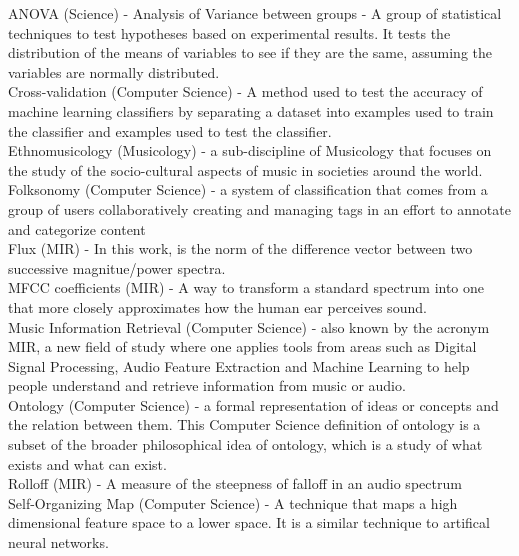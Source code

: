 \label{chapter:glossary}

ANOVA (Science) - Analysis of Variance between groups - A group of statistical techniques to test hypotheses based on experimental results.  It tests the distribution of the means of variables to see if they are the same, assuming the variables are normally distributed.
\\

Cross-validation (Computer Science) - A method used to test the accuracy of machine learning classifiers by separating a dataset into examples used to train the classifier and examples used to test the classifier.
\\

Ethnomusicology (Musicology) - a sub-discipline of Musicology that focuses on the study of the socio-cultural aspects of music in societies around the world.
\\

Folksonomy (Computer Science) - a system of classification that comes from a group of users collaboratively creating and managing tags in an effort to annotate and categorize content
\\

Flux (MIR) - In this work, is the norm of the difference vector between two successive magnitue/power spectra.
\\

MFCC coefficients (MIR) - A way to transform a standard spectrum into one that more closely approximates how the human ear perceives sound.
\\
Music Information Retrieval (Computer Science) - also known by the acronym MIR, a new field of study where one applies tools from areas such as Digital Signal Processing, Audio Feature Extraction and Machine Learning to help people understand and retrieve information from music or audio.
\\

Ontology (Computer Science) - a formal representation of ideas or concepts and the relation between them.  This Computer Science definition of ontology is a subset of the broader philosophical idea of ontology, which is a study of what exists and what can exist.
\\

Rolloff (MIR) - A measure of the steepness of falloff in an audio spectrum
\\


Self-Organizing Map (Computer Science) - A technique that maps a high
dimensional feature space to a lower space.  It is a similar technique
to artifical neural networks.

